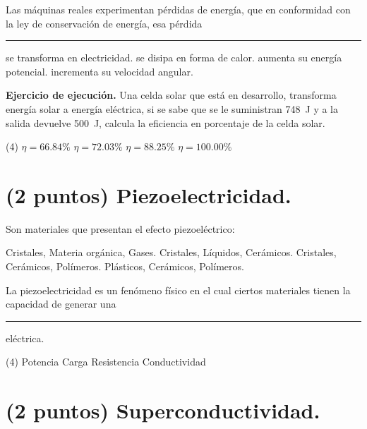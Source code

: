 \documentclass[12pt, letter]{exam}
\begin{document}
\begin{questions}
    \question Las máquinas reales experimentan pérdidas de energía, que en conformidad con la ley de conservación de energía, esa pérdida \rule{2cm}{0.1mm}
    \begin{multicols}{2}
    \begin{tasks}
        \task se transforma en electricidad.
        \task se disipa en forma de calor.
        \task aumenta su energía potencial.
        \task incrementa su velocidad angular.
    \end{tasks}
    \end{multicols}
    \question \label{Ejercicio_13} \textbf{Ejercicio de ejecución. } Una celda solar que está en desarrollo, transforma energía solar a energía eléctrica, si se sabe que se le suministran \SI{748}{\joule} y a la salida devuelve \SI{500}{\joule}, calcula la eficiencia en porcentaje de la celda solar.
    \begin{tasks}(4)
        \task $\eta = 66.84 \%$
        \task $\eta = 72.03 \%$
        \task $\eta = 88.25 \%$
        \task $\eta = 100.00 \%$
    \end{tasks}
    
    \section{(2 puntos) Piezoelectricidad.}

    \question Son materiales que presentan el efecto piezoeléctrico:
    \begin{multicols}{2}
    \begin{tasks}
        \task Cristales, Materia orgánica, Gases.
        \task Cristales, Líquidos, Cerámicos.
        \task Cristales, Cerámicos, Polímeros.
        \task Plásticos, Cerámicos, Polímeros.
    \end{tasks}
    \end{multicols}
    \question La piezoelectricidad es un fenómeno físico en el cual ciertos materiales tienen la capacidad de generar una \rule{2cm}{0.1mm} eléctrica.
    \begin{tasks}(4)
        \task Potencia
        \task Carga
        \task Resistencia
        \task Conductividad
    \end{tasks}


    \section{(2 puntos) Superconductividad.}


\end{questions}
\end{document}
